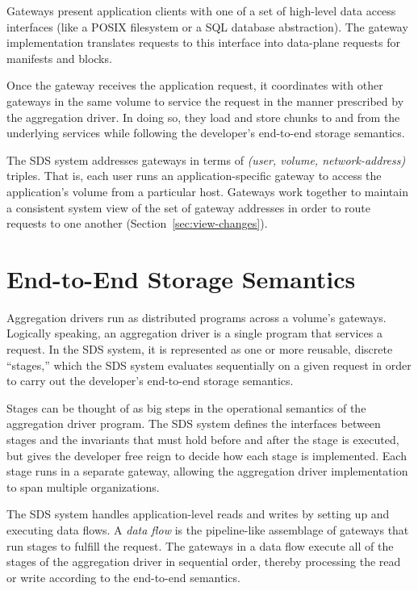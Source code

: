 Gateways present application clients with one of a set of high-level data access
interfaces (like a POSIX filesystem or a SQL database abstraction).
The gateway implementation translates requests to this interface
into data-plane requests for manifests and blocks.

Once the gateway receives the application request, it coordinates with other
gateways in the same volume to service the request in the manner prescribed by
the aggregation driver.  In doing so, they load and store chunks to and from the
underlying services while following the developer's end-to-end storage
semantics.

The SDS system addresses gateways in terms of \textit{(user, volume,
network-address)} triples.  That is, each user runs an application-specific gateway to access the
application's volume from a particular host.  Gateways work together to maintain
a consistent system view of the set of gateway addresses in order to route
requests to one another (Section~\ref{sec:view-changes}).

\section{End-to-End Storage Semantics}
\label{sec:aggregation-driver-model}

Aggregation drivers run as distributed programs across a volume's gateways.
Logically speaking, an aggregation driver is a single program that services a
request.  In the SDS system, it is represented as
one or more reusable, discrete ``stages,'' which the SDS
system evaluates sequentially on a given request in order to carry out the
developer's end-to-end storage semantics.

Stages can be thought of as big steps in the operational semantics of the
aggregation driver program.  The SDS system defines the interfaces between stages
and the invariants that must hold before and after the stage is executed,
but gives the developer free reign to decide how each stage is implemented.
Each stage runs in a separate gateway, allowing the aggregation driver
implementation to span multiple organizations.

The SDS system handles application-level reads and writes by setting up and
executing data flows.  A \emph{data flow} is the pipeline-like assemblage of gateways
that run stages to fulfill the request.  The gateways in a data flow execute all
of the stages of the aggregation driver in sequential order, thereby processing the
read or write according to the end-to-end semantics.


